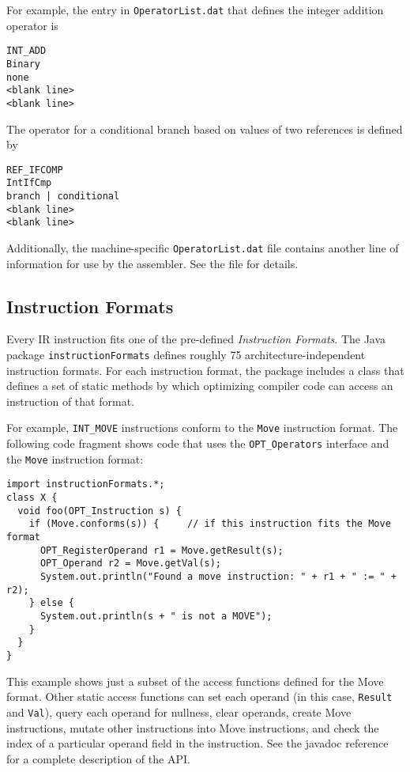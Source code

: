 For example, the entry in {\tt OperatorList.dat} that defines the integer
addition operator is
\begin{verbatim}
INT_ADD
Binary
none
<blank line>
<blank line>
\end{verbatim}

The operator for a conditional branch based on values of two references is
defined by
\begin{verbatim}
REF_IFCOMP
IntIfCmp
branch | conditional
<blank line>
<blank line>
\end{verbatim}

Additionally,  the machine-specific {\tt OperatorList.dat} file contains 
another line of information for use by the assembler.  See the file
for details. 

\PowerPCTMFooter

\subsection{Instruction Formats}\label{iformats}

Every IR instruction fits one of the pre-defined {\em Instruction Formats}.
The Java package {\tt instructionFormats} defines roughly 75 architecture-independent
instruction formats.  For each instruction format, the package includes a class
that defines a set of static methods by which optimizing compiler
code can access an instruction of that format.

For example, {\tt INT\_MOVE} instructions conform to the {\tt Move}
instruction format.  The following code fragment shows code that uses the
{\tt OPT\_Operators} interface and the {\tt Move} instruction format:
\begin{verbatim}
import instructionFormats.*;
class X {
  void foo(OPT_Instruction s) {
    if (Move.conforms(s)) {     // if this instruction fits the Move format
      OPT_RegisterOperand r1 = Move.getResult(s);
      OPT_Operand r2 = Move.getVal(s);
      System.out.println("Found a move instruction: " + r1 + " := " + r2);
    } else {
      System.out.println(s + " is not a MOVE");
    }
  }
}
\end{verbatim}

This example shows just a subset of the access functions defined for the
Move format.  Other static access functions can set each operand 
(in this case, {\tt Result} and {\tt Val}), query each operand for
nullness, clear operands, create Move instructions, mutate other
instructions into Move instructions, and check the index of a particular
operand field in the instruction.  See the javadoc reference for a complete
description of the API.

